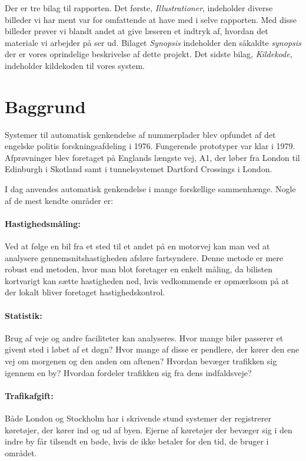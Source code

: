 Der er tre bilag til rapporten. Det første, \textit{Illustrationer}, indeholder diverse billeder vi har ment var for omfattende at have med i selve rapporten. Med disse billeder prøver vi blandt andet at give læseren et indtryk af, hvordan det materiale vi arbejder på ser ud. Bilaget \textit{Synopsis} indeholder den såkaldte \textit{synopsis} der er vores oprindelige beskrivelse af dette projekt. Det sidste bilag, \textit{Kildekode}, indeholder kildekoden til vores system.

\section{Baggrund}
Systemer til automatisk genkendelse af nummerplader blev opfundet af det engelske politis forskningsafdeling i 1976. Fungerende prototyper var klar i 1979. Afprøvninger blev foretaget på Englands længste vej, A1, der løber fra London til Edinburgh i Skotland samt i tunnelsystemet Dartford Crossings i London\cite{wiki_baggrund}. 

I dag anvendes automatisk genkendelse i mange forskellige sammenhænge. Nogle af de mest kendte områder er:

\paragraph{Hastighedsmåling:}
Ved at følge en bil fra et sted til et andet på en motorvej kan man ved at analysere gennemsnitshastigheden afsløre fartsyndere. Denne metode er mere robust end metoden, hvor man blot foretager en enkelt måling, da bilisten kortvarigt kan sætte hastigheden ned, hvis vedkommende er opmærksom på at der lokalt bliver foretaget hastighedskontrol.

\paragraph{Statistik:}
Brug af veje og andre faciliteter kan analyseres. Hvor mange biler passerer et givent sted i løbet af et døgn? Hvor mange af disse er pendlere, der kører den ene vej om morgenen og den anden om aftenen? Hvordan bevæger trafikken sig igennem en by? Hvordan fordeler trafikken sig fra dens indfaldsveje?

\paragraph{Trafikafgift:}
Både London og Stockholm har i skrivende stund systemer der registrerer køretøjer, der kører ind og ud af byen. Ejerne af køretøjer der bevæger sig i den indre by får tilsendt en bøde, hvis de ikke betaler for den tid, de bruger i området.

